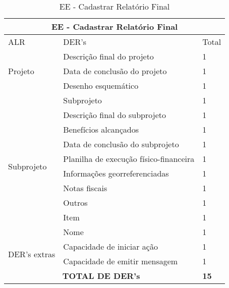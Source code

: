 \begin{table}[!h]
\centering
\caption{EE - Cadastrar Relatório Final}
\label{ee_cadastrar_relatório_final}
\begin{tabular}{|l|l|l|}
\hline
\multicolumn{3}{|c|}{EE - Cadastrar Relatório Final}                                                                 \\ \hline
ALR                           & DER's                                                & Total              \\ \hline
\multirow{3}{*}{Projeto}     & Descrição final do projeto             & 1 \\ \cline{2-3}
                             & Data de conclusão do projeto           & 1 \\ \cline{2-3}
                             & Desenho esquemático                    & 1 \\ \cline{2-3} \hline
\multirow{10}{*}{Subprojeto} & Subprojeto                             & 1 \\ \cline{2-3}
                             & Descrição final do subprojeto          & 1 \\ \cline{2-3}
                             & Benefícios alcançados                  & 1 \\ \cline{2-3}
                             & Data de conclusão do subprojeto        & 1 \\ \cline{2-3}
                             & Planilha de execução físico-financeira & 1 \\ \cline{2-3}
                             & Informações georreferenciadas          & 1 \\ \cline{2-3}
                             & Notas fiscais                          & 1 \\ \cline{2-3}
                             & Outros                                 & 1 \\ \cline{2-3}
                             & Item                                   & 1 \\ \cline{2-3}
                             & Nome                                   & 1 \\ \cline{2-3} \hline
\multirow{2}{*}{DER's extras} & Capacidade de iniciar ação             & 1 \\ \cline{2-3}
                 & Capacidade de emitir mensagem& 1 \\ \hline

\multicolumn{2}{|c|}{\textbf{TOTAL DE DER's}}                                                 & \textbf{15}                 \\ \hline
\end{tabular}
\end{table}




